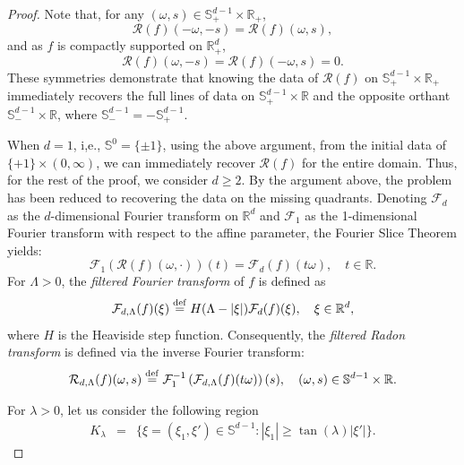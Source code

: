 \documentclass[11pt,reqno]{amsart}
\theoremstyle{plain}
\theoremstyle{definition}
\numberwithin{equation}{section}
\newcommand{\R}{\mathbb{R}}
\newcommand{\ltt}{\left(}
\newcommand{\rtt}{\right)}
\newcommand{\beas}{\begin{eqnarray*}}
\newcommand{\eeas}{\end{eqnarray*}}
\newcommand{\bydef}{\stackrel{\rm def}{=}}
\begin{document}
\begin{proof}
    Note that, for any $(\omega,s)\in\mathbb S^{d-1}_+\times\R_+$, 
\[
\mathcal R(f)(-\omega,-s)=\mathcal R(f)(\omega,s),
\]
and as $f$ is compactly supported on $\R^d_+$,
\[
 \mathcal R(f)(\omega,-s)=  \mathcal R(f)(-\omega,s)=0.
\]
These symmetries demonstrate that knowing the data of $\mathcal R(f)$ on $\mathbb S^{d-1}_+\times \R_+$ immediately recovers the full lines of data on $\mathbb S^{d-1}_+\times \R$ and the opposite orthant $\mathbb S^{d-1}_-\times\R$, where  $\mathbb S^{d-1}_-=-\mathbb S^{d-1}_+ $. 


When $d=1$, i,e., $\mathbb S^0=\{\pm 1\}$, using the above argument, from the initial data of $\{+1\}\times (0,\infty)$, we can immediately recover $\mathcal R(f)$ for the entire domain. 
Thus, for the rest of the proof, we consider $d\geq 2$.   
By the argument above, the problem has been reduced to recovering the data on the missing quadrants. Denoting $\mathcal F_d$ as the $d$-dimensional Fourier transform on $\R^d$ and $\mathcal F_1$ as the 1-dimensional Fourier transform with respect to the affine parameter, the Fourier Slice Theorem yields:
\[
\mathcal F_1\ltt \mathcal R(f)(\omega,\cdot)\rtt(t)=\mathcal F_d(f)(t \omega),\quad t\in \R.
\]
For $\Lambda>0$, the {\em filtered Fourier transform} of $f$ is defined as
\[
\mathcal F_{d,\Lambda}(f)(\xi)\bydef H(\Lambda-|\xi|)\mathcal F_d(f)(\xi), \quad \xi\in\R^d,
\]
where $H$ is the Heaviside step function. Consequently, the {\em filtered Radon transform} is defined via the inverse Fourier transform:
\[
\mathcal R_{d,\Lambda} (f)(\omega,s) \bydef \mathcal F_1^{-1}\ltt\mathcal F_{d,\Lambda}(f)(t\omega)\rtt(s),\quad (\omega,s)\in \mathbb S^{d-1}\times \R.
\]

For $\lambda>0$, let us consider the following region
\beas
K_\lambda
&=& \{\xi=(\xi_1,\xi')\in\mathbb S^{d-1}: |\xi_1|\geq \tan(\lambda) |\xi'|\}.
\eeas 


\end{proof}
\end{document}
